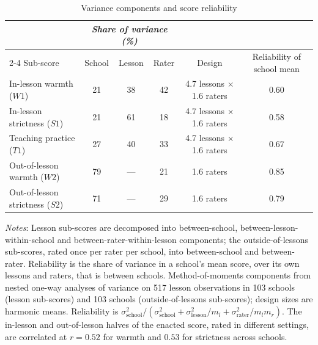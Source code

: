 \begin{table}[htbp]
\centering
\caption{Variance components and score reliability}
\label{tab:score_reliability}
\small
\begin{tabular}{lccccc}
\toprule
 & \multicolumn{3}{c}{\textit{Share of variance (\%)}} & & \\
\cmidrule(lr){2-4}
Sub-score & School & Lesson & Rater & Design & Reliability of school mean \\
\midrule
In-lesson warmth ($W1$) & 21 & 38 & 42 & 4.7 lessons $\times$ 1.6 raters & 0.60 \\
In-lesson strictness ($S1$) & 21 & 61 & 18 & 4.7 lessons $\times$ 1.6 raters & 0.58 \\
Teaching practice ($T1$) & 27 & 40 & 33 & 4.7 lessons $\times$ 1.6 raters & 0.67 \\
\addlinespace[3pt]
Out-of-lesson warmth ($W2$) & 79 & --- & 21 & 1.6 raters & 0.85 \\
Out-of-lesson strictness ($S2$) & 71 & --- & 29 & 1.6 raters & 0.79 \\
\bottomrule
\end{tabular}
\begin{minipage}{0.92\linewidth}
\vspace{4pt}\scriptsize
\textit{Notes}: Lesson sub-scores are decomposed into between-school, between-lesson-within-school and between-rater-within-lesson components; the outside-of-lessons sub-scores, rated once per rater per school, into between-school and between-rater. Reliability is the share of variance in a school's mean score, over its own lessons and raters, that is between schools. Method-of-moments components from nested one-way analyses of
variance on 517 lesson observations in 103 schools
(lesson sub-scores) and 103 schools (outside-of-lessons sub-scores);
design sizes are harmonic means. Reliability is $\sigma^2_{\mathrm{school}} /
(\sigma^2_{\mathrm{school}} + \sigma^2_{\mathrm{lesson}}/m_l + \sigma^2_{\mathrm{rater}}/m_l m_r)$.
The in-lesson and out-of-lesson halves of the enacted score, rated in different
settings, are correlated at $r = 0.52$ for warmth and $0.53$ for
strictness across schools.
\end{minipage}
\end{table}
